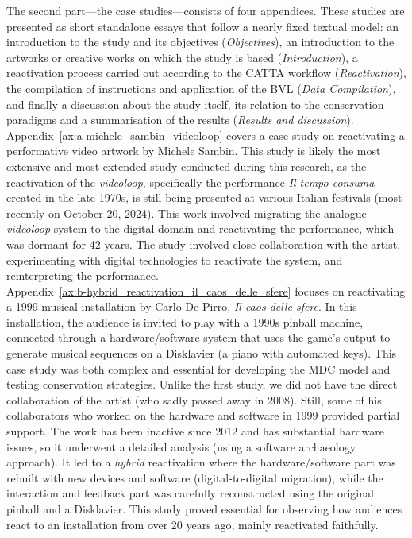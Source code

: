\newline
The second part—the case studies—consists of four appendices. These studies are presented as short standalone essays that follow a nearly fixed textual model: an introduction to the study and its objectives (\textit{Objectives}), an introduction to the artworks or creative works on which the study is based (\textit{Introduction}), a reactivation process carried out according to the CATTA workflow (\textit{Reactivation}), the compilation of instructions and application of the BVL (\textit{Data Compilation}), and finally a discussion about the study itself, its relation to the conservation paradigms and a summarisation of the results (\textit{Results and discussion}).\\
Appendix~\ref{ax:a-michele_sambin_videoloop} covers a case study on reactivating a performative video artwork by Michele Sambin. This study is likely the most extensive and most extended study conducted during this research, as the reactivation of the \textit{videoloop}, specifically the performance \textit{Il tempo consuma} created in the late 1970s, is still being presented at various Italian festivals (most recently on October 20, 2024). This work involved migrating the analogue \textit{videoloop} system to the digital domain and reactivating the performance, which was dormant for 42 years. The study involved close collaboration with the artist, experimenting with digital technologies to reactivate the system, and reinterpreting the performance.\\
Appendix~\ref{ax:b-hybrid_reactivation_il_caos_delle_sfere} focuses on reactivating a 1999 musical installation by Carlo De Pirro, \textit{Il caos delle sfere}. In this installation, the audience is invited to play with a 1990s pinball machine, connected through a hardware/software system that uses the game’s output to generate musical sequences on a Disklavier (a piano with automated keys). This case study was both complex and essential for developing the MDC model and testing conservation strategies. Unlike the first study, we did not have the direct collaboration of the artist (who sadly passed away in 2008). Still, some of his collaborators who worked on the hardware and software in 1999 provided partial support. The work has been inactive since 2012 and has substantial hardware issues, so it underwent a detailed analysis (using a software archaeology approach). It led to a \textit{hybrid} reactivation where the hardware/software part was rebuilt with new devices and software (digital-to-digital migration), while the interaction and feedback part was carefully reconstructed using the original pinball and a Disklavier. This study proved essential for observing how audiences react to an installation from over 20 years ago, mainly reactivated faithfully.\\
